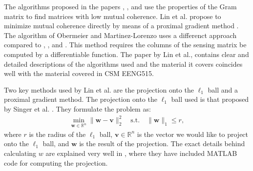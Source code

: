 \documentclass[journal]{IEEEtran}
\begin{document}
The algorithms proposed in the papers \cite{Elard}, \cite{Sapiro}, and \cite{Xu} use the properties 
of the Gram matrix to find matrices with low mutual coherence. Lin et al. propose to minimize mutual coherence directly by means of a proximal gradient method \cite{Lin}. 
The algorithm of Obermeier and Martinez-Lorenzo uses a differenct approach compared to  \cite{Elard}, \cite{Xu}, and \cite{Sapiro}. This method requires the columns of the sensing matrix be computed by a differentiable function. 
The paper by Lin et al., contains clear and detailed descriptions of the algorithms used and the material it covers coincides well with the material 
covered in CSM EENG515.

Two key methods used by Lin et al. are the projection onto the $\ell_1$ ball and a proximal gradient
method. The projection onto the $\ell_1$ ball used is that
proposed by Singer et al. \cite{l1_ball}. They formulate the problem as:
\begin{align}
   \min\limits_{\mathbf{w}\in\mathbb{R}^n} \|\mathbf{w}-\mathbf{v} \|^2_2 \quad \mathrm{s.t.} \quad \|\mathbf{w} \|_1 \leq r, 
\end{align}
where $r$ is the radius of the $\ell_1$ ball, $\mathbf{v}\in\mathbb{R}^n$ is the vector we would like to project onto the $\ell_1$ ball, and $\mathbf{w}$ is the result of the projection. The exact details
behind calculating $w$ are explained very well in \cite{l1_ball}, where they have included MATLAB code 
for computing the projection.
\end{document}
